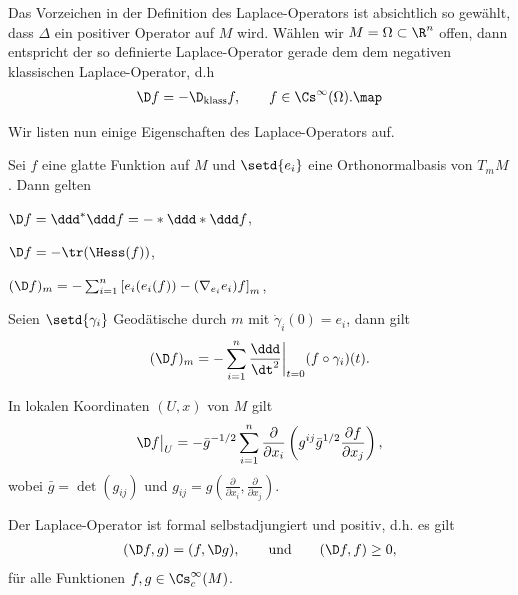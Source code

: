\documentclass[%
	paper=a5,%
	fleqn,%
	DIV=18,%
	BCOR=0mm,
	fontsize=11pt,
	titlepage=false,%
	bibliography=totoc,
	DIV=18,%
	twoside=true,
	pdftitle=Riemannsche Geometrie,
	pdfauthor=Uwe Semmelmann,
	numbers=noendperiod]%
	{scrbook}
\begin{document}
\begin{rem}
Das Vorzeichen in der Definition des Laplace-Operators ist absichtlich so gewählt, dass $\Delta$ ein positiver Operator auf $M$ wird. Wählen wir $M=\Omega\subset \R^n$ offen, dann entspricht der so definierte Laplace-Operator gerade dem dem negativen klassischen Laplace-Operator, d.h
\begin{align*}
\D f = -\D_{\text{klass}}f,\qquad f\in\Cs^\infty(\Omega).\map
\end{align*}
\end{rem}

Wir listen nun einige Eigenschaften des Laplace-Operators auf.

\begin{prop}
Sei $f$ eine glatte Funktion auf $M$ und $\setd{e_{i}}$ eine Orthonormalbasis von $T_{m}M$. Dann gelten
\begin{propenum}
\item $\D f = \ddd^*\ddd f = -*\ddd*\ddd f$,
\item $\D f = -\tr(\Hess(f))$,
\item $(\D f)_{m} = -\sum_{i=1}^n \left[ e_{i}(e_{i}(f)) - (\nabla_{e_{i}}e_{i})f\right]_{m}$,
\item Seien $\setd{\gamma_{i}}$ Geodätische durch $m$ mit $\dot{\gamma}_{i}(0) = e_{i}$, dann gilt
\begin{align*}
(\D f)_{m} = -\sum_{i=1}^n \frac{\ddd}{\dt^2}\bigg|_{t=0} (f\circ\gamma_{i})(t).
\end{align*}
\item In lokalen Koordinaten $(U,x)$ von $M$ gilt
\begin{align*}
\D f\big|_{U} = - \bar{g}^{-1/2} \sum_{i=1}^n \frac{\partial}{\partial x_{i}} \left( g^{ij} \bar{g}^{1/2} \frac{\partial f}{\partial x_{j}}\right),
\end{align*}
wobei $\bar{g} = \det(g_{ij})$ und $g_{ij} = g\left( \frac{\partial}{\partial x_{i}},\frac{\partial}{\partial x_{j}}\right)$.
\item Der Laplace-Operator ist formal selbstadjungiert und positiv, d.h. es gilt
\begin{align*}
(\D f,g) = (f,\D g),\qquad \text{und}\qquad (\D f,f) \ge 0,
\end{align*}
für alle Funktionen $f,g\in\Cs_{c}^\infty(M)$.\fish
\end{propenum}
\end{prop}
\end{document}
